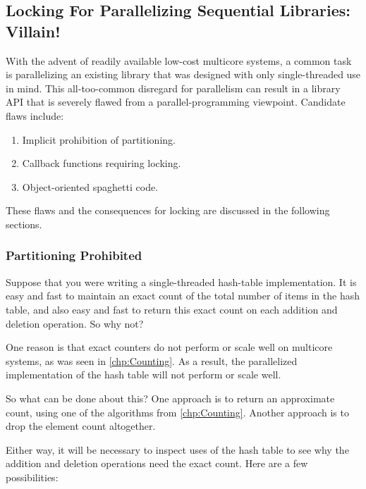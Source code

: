 \subsection{Locking For Parallelizing Sequential Libraries: Villain!}
\label{sec:locking:Locking For Parallelizing Sequential Libraries: Villain!}

With the advent of readily available low-cost multicore systems,
a common task is parallelizing an existing library that was designed
with only single-threaded use in mind.
This all-too-common disregard for parallelism can result in a library
API that is severely flawed from a parallel-programming viewpoint.
Candidate flaws include:

\begin{enumerate}
\item	Implicit prohibition of partitioning.
\item	Callback functions requiring locking.
\item	Object-oriented spaghetti code.
\end{enumerate}

These flaws and the consequences for locking are discussed in the following
sections.

\subsubsection{Partitioning Prohibited}
\label{sec:locking:Partitioning Prohibited}

Suppose that you were writing a single-threaded hash-table implementation.
It is easy and fast to maintain an exact count of the total number of items
in the hash table, and also easy and fast to return this exact count on each
addition and deletion operation.
So why not?

One reason is that exact counters do not perform or scale well on
multicore systems, as was
seen in \cref{chp:Counting}.
As a result, the parallelized implementation of the hash table will not
perform or scale well.

So what can be done about this?
One approach is to return an approximate count, using one of the algorithms
from \cref{chp:Counting}.
Another approach is to drop the element count altogether.

Either way, it will be necessary to inspect uses of the hash table to see
why the addition and deletion operations need the exact count.
Here are a few possibilities:

